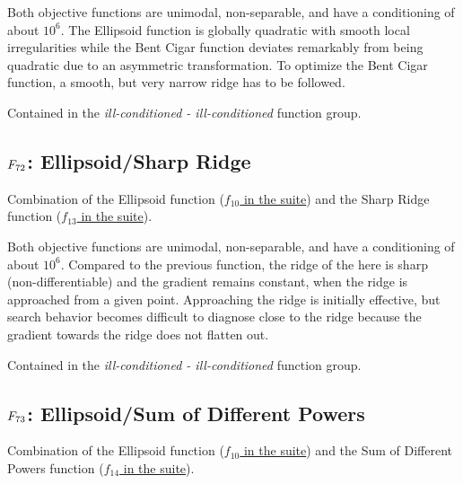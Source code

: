 Both objective functions are unimodal, non-separable, and have a conditioning
of about \(10^6\). The Ellipsoid function is globally quadratic with
smooth local irregularities while the Bent Cigar function deviates remarkably
from being quadratic due to an asymmetric transformation. To optimize the
Bent Cigar function, a smooth, but very narrow ridge has to be followed.

Contained in the \emph{ill-conditioned - ill-conditioned} function group.



\subsection[\texorpdfstring{\protect\(F_{72}\protect\): Ellipsoid/Sharp Ridge}{F72: Ellipsoid/Sharp Ridge}]{\texorpdfstring{\protect\(F_{72}\protect\): Ellipsoid/Sharp Ridge}{}}
\label{index:ellipsoid-sharp-ridge}\label{index:f72}
Combination of the Ellipsoid function (\href{https://coco.gforge.inria.fr/downloads/download16.00/bbobdocfunctions.pdf\#page=50}{\(f_{10}\) in the \bbob suite}) and the
Sharp Ridge function (\href{https://coco.gforge.inria.fr/downloads/download16.00/bbobdocfunctions.pdf\#page=65}{\(f_{13}\) in the \bbob suite}).

Both objective functions are unimodal, non-separable, and have a conditioning
of about \(10^6\). Compared to the previous function, the ridge of the
here is sharp (non-differentiable) and the gradient remains constant, when the
ridge is approached from a given point. Approaching the ridge is
initially effective, but search behavior becomes difficult to diagnose
close to the ridge because the gradient towards the ridge does not flatten out.

Contained in the \emph{ill-conditioned - ill-conditioned} function group.



\subsection[\texorpdfstring{\protect\(F_{73}\protect\): Ellipsoid/Sum of Different Powers}{F73: Ellipsoid/Sum of Different Powers}]{\texorpdfstring{\protect\(F_{73}\protect\): Ellipsoid/Sum of Different Powers}{}}
\label{index:ellipsoid-sum-of-different-powers}\label{index:f73}
Combination of the Ellipsoid function (\href{https://coco.gforge.inria.fr/downloads/download16.00/bbobdocfunctions.pdf\#page=50}{\(f_{10}\) in the \bbob suite}) and the
Sum of Different Powers function (\href{https://coco.gforge.inria.fr/downloads/download16.00/bbobdocfunctions.pdf\#page=70}{\(f_{14}\) in the \bbob suite}).

